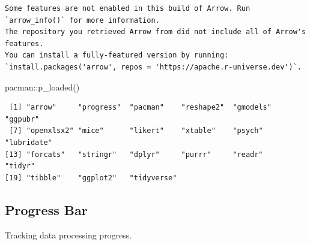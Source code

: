 \documentclass[
  letterpaper,
  DIV=11,
  numbers=noendperiod]{scrartcl}
\newenvironment{Shaded}{\begin{snugshade}}{\end{snugshade}}
\newcommand{\AttributeTok}[1]{\textcolor[rgb]{0.40,0.45,0.13}{#1}}
\newcommand{\CommentTok}[1]{\textcolor[rgb]{0.37,0.37,0.37}{#1}}
\newcommand{\ConstantTok}[1]{\textcolor[rgb]{0.56,0.35,0.01}{#1}}
\newcommand{\ControlFlowTok}[1]{\textcolor[rgb]{0.00,0.23,0.31}{#1}}
\newcommand{\DecValTok}[1]{\textcolor[rgb]{0.68,0.00,0.00}{#1}}
\newcommand{\DocumentationTok}[1]{\textcolor[rgb]{0.37,0.37,0.37}{\textit{#1}}}
\newcommand{\FloatTok}[1]{\textcolor[rgb]{0.68,0.00,0.00}{#1}}
\newcommand{\FunctionTok}[1]{\textcolor[rgb]{0.28,0.35,0.67}{#1}}
\newcommand{\NormalTok}[1]{\textcolor[rgb]{0.00,0.23,0.31}{#1}}
\newcommand{\OtherTok}[1]{\textcolor[rgb]{0.00,0.23,0.31}{#1}}
\newcommand{\SpecialCharTok}[1]{\textcolor[rgb]{0.37,0.37,0.37}{#1}}
\newcommand{\StringTok}[1]{\textcolor[rgb]{0.13,0.47,0.30}{#1}}
\begin{document}
\begin{verbatim}
Some features are not enabled in this build of Arrow. Run `arrow_info()` for more information.
The repository you retrieved Arrow from did not include all of Arrow's features.
You can install a fully-featured version by running:
`install.packages('arrow', repos = 'https://apache.r-universe.dev')`.
\end{verbatim}

\begin{Shaded}
\begin{Highlighting}[]
\NormalTok{pacman}\SpecialCharTok{::}\FunctionTok{p\_loaded}\NormalTok{()}
\end{Highlighting}
\end{Shaded}

\begin{verbatim}
 [1] "arrow"     "progress"  "pacman"    "reshape2"  "gmodels"   "ggpubr"   
 [7] "openxlsx2" "mice"      "likert"    "xtable"    "psych"     "lubridate"
[13] "forcats"   "stringr"   "dplyr"     "purrr"     "readr"     "tidyr"    
[19] "tibble"    "ggplot2"   "tidyverse"
\end{verbatim}

\subsection{Progress Bar}\label{progress-bar}

Tracking data processing progress.

\begin{Shaded}
\end{Shaded}
\end{document}
